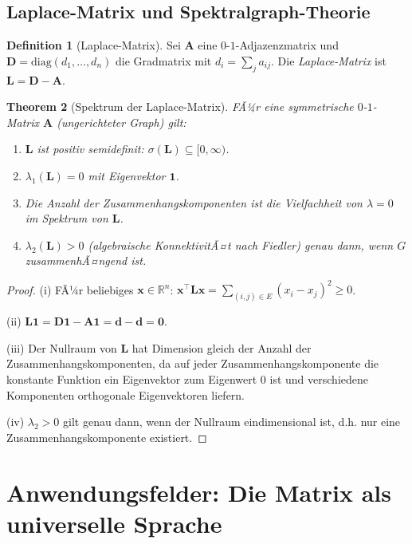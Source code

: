 ﻿\documentclass[12pt, a4paper]{article}
\newtheorem{theorem}{Theorem}[section]
\theoremstyle{definition}
\newtheorem{definition}[theorem]{Definition}
\theoremstyle{remark}
\newcommand{\R}{\mathbb{R}}
\newcommand{\vA}{\bm{A}}
\newcommand{\vD}{\bm{D}}
\newcommand{\vL}{\bm{L}}
\newcommand{\T}{\top}
\newcommand{\spec}{\sigma}
\newcommand{\diag}{\mathrm{diag}}
\begin{document}
\subsection{Laplace-Matrix und Spektralgraph-Theorie}
\label{subsec:laplace}

\begin{definition}[Laplace-Matrix]
Sei $\vA$ eine $0$-$1$-Adjazenzmatrix und $\vD = \diag(d_1,\ldots,d_n)$
die Gradmatrix mit $d_i = \sum_j a_{ij}$. Die \emph{Laplace-Matrix} ist
$\vL = \vD - \vA$.
\end{definition}

\begin{theorem}[Spektrum der Laplace-Matrix]
\label{thm:laplace}
FÃ¼r eine symmetrische $0$-$1$-Matrix $\vA$ (ungerichteter Graph) gilt:
\begin{enumerate}[label=(\roman*)]
  \item $\vL$ ist positiv semidefinit: $\spec(\vL) \subseteq [0,\infty)$.
  \item $\lambda_1(\vL) = 0$ mit Eigenvektor $\mathbf{1}$.
  \item Die Anzahl der Zusammenhangskomponenten ist die Vielfachheit
    von $\lambda = 0$ im Spektrum von $\vL$.
  \item $\lambda_2(\vL) > 0$ (algebraische KonnektivitÃ¤t nach Fiedler)
    genau dann, wenn $G$ zusammenhÃ¤ngend ist.
\end{enumerate}
\end{theorem}

\begin{proof}
(i) FÃ¼r beliebiges $\bm{x} \in \R^n$:
$\bm{x}^\T \vL \bm{x} = \sum_{(i,j)\in E}(x_i - x_j)^2 \geq 0$.

(ii) $\vL \mathbf{1} = \vD\mathbf{1} - \vA\mathbf{1} = \bm{d} - \bm{d} = \mathbf{0}$.

(iii) Der Nullraum von $\vL$ hat Dimension gleich der Anzahl der
Zusammenhangskomponenten, da auf jeder Zusammenhangskomponente
die konstante Funktion ein Eigenvektor zum Eigenwert 0 ist und
verschiedene Komponenten orthogonale Eigenvektoren liefern.

(iv) $\lambda_2 > 0$ gilt genau dann, wenn der Nullraum eindimensional
ist, d.h. nur eine Zusammenhangskomponente existiert.
\end{proof}

\section{Anwendungsfelder: Die Matrix als universelle Sprache}
\label{sec:anwendungen}
\end{document}
